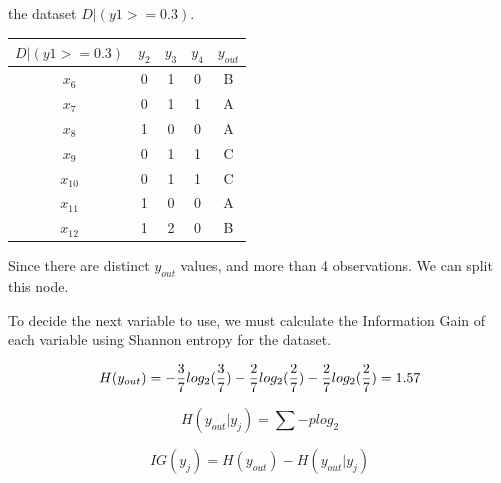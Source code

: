 \documentclass{article}
\begin{document}
\begin{enumerate}[leftmargin=\labelsep]
\begin{minipage}{0.6\textwidth}
  the dataset $D | (y1 >= 0.3)$.
  \begin{table}[H]
    \centering
    \begin{tabular}{@{}ccccc}
      $D | (y1 >= 0.3)$ & $y_2$ & $y_3$ & $y_4$ & $y_{out}$ \\ \midrule
      $x_6$  & 0 & 1 & 0 & B \\
      $x_7$  & 0 & 1 & 1 & A \\
      $x_8$  & 1 & 0 & 0 & A \\
      $x_9$  & 0 & 1 & 1 & C \\
      $x_{10}$ & 0 & 1 & 1 & C \\
      $x_{11}$ & 1 & 0 & 0 & A \\
      $x_{12}$ & 1 & 2 & 0 & B \\
    \end{tabular}
  \end{table}

  Since there are distinct $y_{out}$ values, and more 
  than 4 observations. We can split this node.
\end{minipage}
 
\hspace{3pt}

To decide the next variable to use, we must calculate 
the Information Gain of each variable using Shannon 
entropy for the dataset.

\begin{equation*}
    H(y_{out}) = -\frac{3}{7}log_2(\frac{3}{7})-\frac{2}{7}log_2(\frac{2}{7})-\frac{2}{7}log_2(\frac{2}{7}) \\ [2ex]
    = 1.57
\end{equation*}

\begin{equation*}
  H(y_{out}|y_j) = \sum{-p log_2}
\end{equation*}

\begin{equation*}
  IG(y_j) = H(y_{out}) - H(y_{out}|y_j)
\end{equation*}


\end{enumerate}
\end{document}
